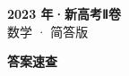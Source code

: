 \documentclass[zihao=-4, a4paper]{ctexart}
\begin{document}
\begin{center}
  {\Large\bfseries 2023 年·新高考Ⅱ卷}\\[4pt]
  {\large 数学 · 简答版}
\end{center}
\medskip
{}

\clearpage
{}
\begin{center}{\Large\bfseries 答案速查}\end{center}
\medskip

\end{document}
